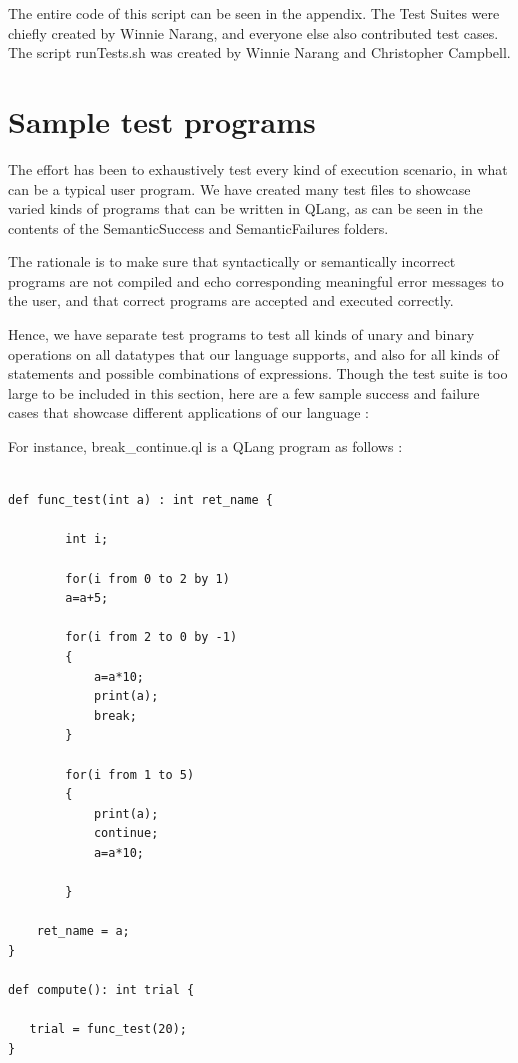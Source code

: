 The entire code of this script can be seen in the appendix. The Test Suites were chiefly created by Winnie Narang, and everyone else also contributed test cases. The script runTests.sh was created by Winnie Narang and Christopher Campbell.


\section{Sample test programs}

The effort has been to exhaustively test every kind of execution scenario, in what can be a typical user program. We have created many test files to showcase varied kinds of programs that can be written in QLang, as can be seen in the contents of the SemanticSuccess and SemanticFailures folders.

The rationale is to make sure that syntactically or semantically incorrect programs are not compiled and echo corresponding meaningful error messages to the user, and that correct programs are accepted and executed correctly.

Hence, we have separate test programs to test all kinds of unary and binary operations on all datatypes that our language supports, and also for all kinds of statements and possible combinations of expressions. 
Though the test suite is too large to be included in this section, here are a few sample success and failure cases that showcase different applications of our language :


For instance, break\_continue.ql is a QLang program as follows :

\begin{lstlisting}

def func_test(int a) : int ret_name { 
        
        int i;

        for(i from 0 to 2 by 1)
        a=a+5;

        for(i from 2 to 0 by -1)
        {
            a=a*10;
            print(a);
            break;
        }

        for(i from 1 to 5)
        {
            print(a);
            continue;
            a=a*10;

        }

    ret_name = a;
}

def compute(): int trial {

   trial = func_test(20);
} 
\end{lstlisting}

